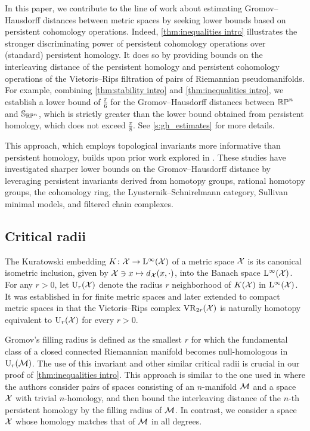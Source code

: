 In this paper, we contribute to the line of work about estimating Gromov--Hausdorff distances between metric spaces by seeking lower bounds based on persistent cohomology operations.
Indeed, \cref{thm:inequalities intro} illustrates the stronger discriminating power of persistent cohomology operations over (standard) persistent homology.
It does so by providing bounds on the interleaving distance of the persistent homology and persistent cohomology operations of the Vietoris--Rips filtration of pairs of Riemannian pseudomanifolds.
For example, combining \cref{thm:stability intro} and \cref{thm:inequalities intro}, we establish a lower bound of $\frac{\pi}{6}$ for the Gromov--Hausdorff distances between \(\mathbb{RP}^n\) and \(\mathbb{S}_{\mathbb{RP}^n}\), which is strictly greater than the lower bound obtained from persistent homology, which does not exceed $\frac{\pi}{8}$.
See \cref{s:gh_estimates} for more details.

This approach, which employs topological invariants more informative than persistent homology, builds upon prior work explored in \cite{zhou2023beyond, zhou2023persistent, memoli2024persistenthomotopy, memoli2024persistent, memoli2025ephemeral}.
These studies have investigated sharper lower bounds on the Gromov--Hausdorff distance by leveraging persistent invariants derived from homotopy groups, rational homotopy groups, the cohomology ring, the Lyusternik--Schnirelmann category, Sullivan minimal models, and filtered chain complexes.

\subsection*{Critical radii}

The Kuratowski embedding \(K \colon \mathcal{X} \to \mathrm{L}^\infty(\mathcal{X})\) of a metric space \(\mathcal{X}\) is its canonical isometric inclusion, given by \(\mathcal{X} \ni x \mapsto d_{\mathcal{X}}(x,\cdot)\), into the Banach space $\mathrm{L}^\infty(\mathcal{X})$.
For any $r>0$, let \(\mathrm{U}_r(\mathcal{X})\) denote the radius \(r\) neighborhood of \(K(\mathcal{X})\) in \(\mathrm{L}^\infty(\mathcal{X})\).
It was established in \cite{chazal2009gromov} for finite metric spaces and later extended to compact metric spaces in \cite{lim2024vietoris} that the Vietoris--Rips complex \(\mathrm{VR}_{2r}(\mathcal{X})\) is naturally homotopy equivalent to \(\mathrm{U}_r(\mathcal{X})\) for every \(r > 0\).

Gromov's filling radius is defined as the smallest \(r\) for which the fundamental class of a closed connected Riemannian manifold becomes null-homologous in \(\mathrm{U}_r(\mathcal{M})\).
The use of this invariant and other similar critical radii is crucial in our proof of \cref{thm:inequalities intro}.
This approach is similar to the one used in \cite[Proposition~9.38]{lim2024vietoris} where the authors consider pairs of spaces consisting of an $n$-manifold \(\mathcal{M}\) and a space \(\mathcal{X}\) with trivial \(n\)-homology, and then bound the interleaving distance of the \(n\)-th persistent homology by the filling radius of \(\mathcal{M}\).
In contrast, we consider a space \(\mathcal{X}\) whose homology matches that of \(\mathcal{M}\) in all degrees.

